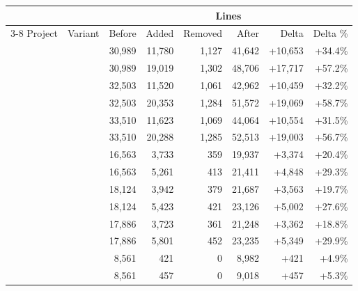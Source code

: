   \begin{tabular*}{\linewidth}{@{\hspace{\tabcolsep}\extracolsep{\fill}}llrrrrrr}
  \toprule
   &  & \multicolumn{6}{c}{Lines} \\
  \cmidrule(lr){3-8}
  Project & Variant & Before & Added & Removed & After & Delta & Delta \% \\
  \midrule
  \DatasetEqBenchA{} & \VariantNaiveC{} & 30,989 & 11,780 & 1,127 & 41,642 & +10,653 & +34.4\% \\
  \DatasetEqBenchA{} & \VariantImprovedC{} & 30,989 & 19,019 & 1,302 & 48,706 & +17,717 & +57.2\% \\
  \DatasetEqBenchB{} & \VariantNaiveC{} & 32,503 & 11,520 & 1,061 & 42,962 & +10,459 & +32.2\% \\
  \DatasetEqBenchB{} & \VariantImprovedC{} & 32,503 & 20,353 & 1,284 & 51,572 & +19,069 & +58.7\% \\
  \DatasetEqBenchC{} & \VariantNaiveC{} & 33,510 & 11,623 & 1,069 & 44,064 & +10,554 & +31.5\% \\
  \DatasetEqBenchC{} & \VariantImprovedC{} & 33,510 & 20,288 & 1,285 & 52,513 & +19,003 & +56.7\% \\
  \midrule
  \DatasetCommonsA{} & \VariantNaiveC{} & 16,563 & 3,733 & 359 & 19,937 & +3,374 & +20.4\% \\
  \DatasetCommonsA{} & \VariantImprovedC{} & 16,563 & 5,261 & 413 & 21,411 & +4,848 & +29.3\% \\
  \DatasetCommonsB{} & \VariantNaiveC{} & 18,124 & 3,942 & 379 & 21,687 & +3,563 & +19.7\% \\
  \DatasetCommonsB{} & \VariantImprovedC{} & 18,124 & 5,423 & 421 & 23,126 & +5,002 & +27.6\% \\
  \DatasetCommonsC{} & \VariantNaiveC{} & 17,886 & 3,723 & 361 & 21,248 & +3,362 & +18.8\% \\
  \DatasetCommonsC{} & \VariantImprovedC{} & 17,886 & 5,801 & 452 & 23,235 & +5,349 & +29.9\% \\
  \midrule
  \DatasetCommonsDev{} & \VariantNaiveC{} & 8,561 & 421 & 0 & 8,982 & +421 & +4.9\% \\
  \DatasetCommonsDev{} & \VariantImprovedC{} & 8,561 & 457 & 0 & 9,018 & +457 & +5.3\% \\
  \bottomrule
  \end{tabular*}

